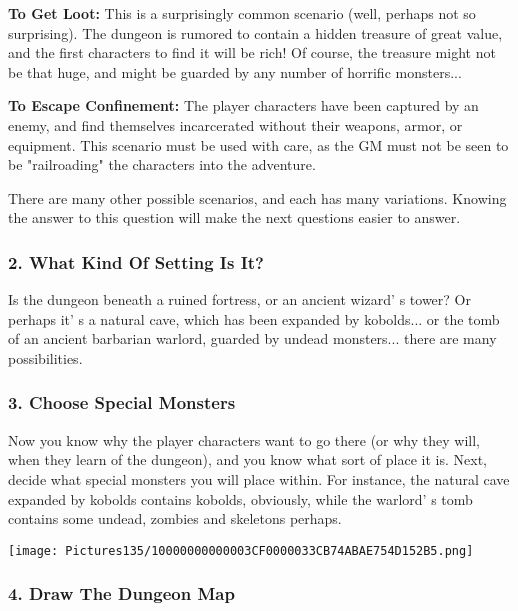 \documentclass[a4paper,twoside,openany,10pt]{book}
\begin{document}
\begin{multicols}{2}
\textbf{To Get Loot:} This is a surprisingly common scenario (well, perhaps not so surprising). The dungeon is rumored to contain a hidden treasure of great value, and the first characters to find it will be rich! Of course, the treasure might not be that huge, and might be guarded by any number of horrific monsters...

\textbf{To Escape Confinement:} The player characters have been captured by an enemy, and find themselves incarcerated without their weapons, armor, or equipment. This scenario must be used with care, as the GM must not be seen to be "railroading" the characters into the adventure. 

There are many other possible scenarios, and each has many variations. Knowing the answer to this question will make the next questions easier to answer.

\subsubsection{2. What Kind Of Setting Is It?}\label{what-kind-of-setting-is-it}

Is the dungeon beneath a ruined fortress, or an ancient wizard' s tower? Or perhaps it' s a natural cave, which has been expanded by kobolds... or the tomb of an ancient barbarian warlord, guarded by undead monsters... there are many possibilities.

\subsubsection{3. Choose Special Monsters}\label{choose-special-monsters}

Now you know why the player characters want to go there (or why they will, when they learn of the dungeon), and you know what sort of place it is. Next, decide what special monsters you will place within. For instance, the natural cave expanded by kobolds contains kobolds, obviously, while the warlord' s tomb contains some undead, zombies and skeletons perhaps.

\begin{center}
	\texttt{[image: Pictures135/10000000000003CF0000033CB74ABAE754D152B5.png]}
\end{center}

\subsubsection{4. Draw The Dungeon Map}\label{draw-the-dungeon-map}


\end{multicols}
\end{document}
